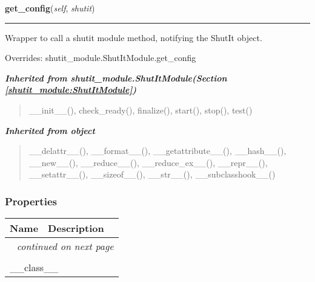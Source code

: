     \vspace{0.5ex}

\hspace{.8\funcindent}\begin{boxedminipage}{\funcwidth}

    \raggedright \textbf{get\_config}(\textit{self}, \textit{shutit})

    \vspace{-1.5ex}

    \rule{\textwidth}{0.5\fboxrule}
\setlength{\parskip}{2ex}
    Wrapper to call a shutit module method, notifying the ShutIt object.

\setlength{\parskip}{1ex}
      Overrides: shutit\_module.ShutItModule.get\_config

    \end{boxedminipage}


\large{\textbf{\textit{Inherited from shutit\_module.ShutItModule\textit{(Section \ref{shutit_module:ShutItModule})}}}}

\begin{quote}
\_\_init\_\_(), check\_ready(), finalize(), start(), stop(), test()
\end{quote}

\large{\textbf{\textit{Inherited from object}}}

\begin{quote}
\_\_delattr\_\_(), \_\_format\_\_(), \_\_getattribute\_\_(), \_\_hash\_\_(), \_\_new\_\_(), \_\_reduce\_\_(), \_\_reduce\_ex\_\_(), \_\_repr\_\_(), \_\_setattr\_\_(), \_\_sizeof\_\_(), \_\_str\_\_(), \_\_subclasshook\_\_()
\end{quote}


  \subsubsection{Properties}

    \vspace{-1cm}
\hspace{\varindent}\begin{longtable}{|p{\varnamewidth}|p{\vardescrwidth}|l}
\cline{1-2}
\cline{1-2} \centering \textbf{Name} & \centering \textbf{Description}& \\
\cline{1-2}
\endhead\cline{1-2}\multicolumn{3}{r}{\small\textit{continued on next page}}\\\endfoot\cline{1-2}
\endlastfoot\multicolumn{2}{|l|}{\textit{Inherited from object}}\\
\multicolumn{2}{|p{\varwidth}|}{\raggedright \_\_class\_\_}\\
\cline{1-2}
\end{longtable}


